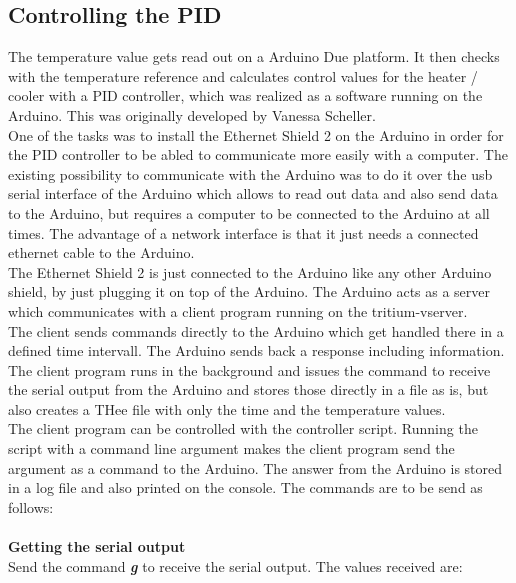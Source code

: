 \documentclass[12pt]{scrartcl}
\begin{document}
      \subsection{Controlling the PID} \label{sec:control}
      The temperature value gets read out on a Arduino Due platform. It then
      checks with the temperature reference and calculates control values
      for the heater / cooler with a PID controller, which was realized as a
      software running on the Arduino. This was originally developed by Vanessa
      Scheller.
      \\One of the tasks was to install the Ethernet Shield 2 on the Arduino in
      order for the PID controller to be abled to communicate more easily with
      a computer. The existing possibility to communicate with the Arduino was
      to do it over the usb serial interface of the Arduino which allows to
      read out data and also send data to the Arduino, but requires a computer
      to be connected to the Arduino at all times. The advantage of a network
      interface is that it just needs a connected ethernet cable to the Arduino.
      \\The Ethernet Shield 2 is just connected to the Arduino like any other
      Arduino shield, by just plugging it on top of the Arduino. The Arduino
      acts as a server which communicates with a client program
       running on the tritium-vserver.
      \\The client sends commands directly to the Arduino which get handled
      there in a defined time intervall. The Arduino sends back a response
      including information.
      \\The client program runs in the background and issues the command to
      receive the serial output from the Arduino and stores those directly in
      a file as is, but also creates a THee file with only the time and the
      temperature values.
      \\The client program can be controlled with the
      controller script. Running the script with a
      command line argument makes the client program send the argument as a
      command to the Arduino. The answer from the Arduino is stored in a log
      file and also printed on the console.
      The commands are to be send as follows:
      \\\\
      \textbf{Getting the serial output} \\
      Send the command \textbf{\textit{g}} to receive the serial output. The values
      received are:
\end{document}
